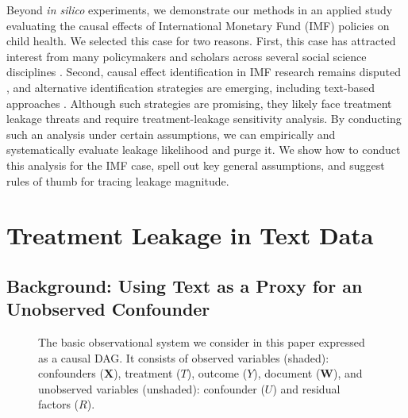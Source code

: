 \documentclass[11pt]{article}
\newcommand{\bX}{\bm{X}} %
\newcommand{\bW}{\bm{W}}  %
\begin{document}
Beyond \textit{in silico} experiments, we demonstrate our methods in an applied study evaluating the causal effects of International Monetary Fund (IMF) policies on child health. We selected this case for two reasons. First, this case has attracted interest from many policymakers \citep{unicef2019} and scholars across several social science disciplines \citep{stuckler2008,dreher2009,daoudImpactInternationalMonetary2017,daoudReinsberg2018,stubbs2020}. Second, causal effect identification in IMF research remains disputed \citep{dreher2009,stubbs2020}, and alternative identification strategies are emerging, including text-based approaches \citep{daoud2019international}. Although such strategies are promising, they likely face treatment leakage threats and require treatment-leakage sensitivity analysis. By conducting such an analysis under certain assumptions, we can empirically and systematically evaluate leakage likelihood and purge it. We show how to conduct this analysis for the IMF case, spell out key general assumptions, and suggest rules of thumb for tracing leakage magnitude.

\section{Treatment Leakage in Text Data}

\subsection{Background: Using Text as a Proxy for an Unobserved Confounder}

\begin{figure}[t]
    \begin{center}
    \end{center}
    \caption{The basic observational system we consider in this paper expressed as a causal DAG. It consists of observed variables (shaded): confounders ($\bX$), treatment ($T$), outcome ($Y$), document ($\bW$), and unobserved variables (unshaded): confounder ($U$) and residual factors ($R$). \label{fig:baselinecausalmodel}}
\end{figure}
\end{document}
